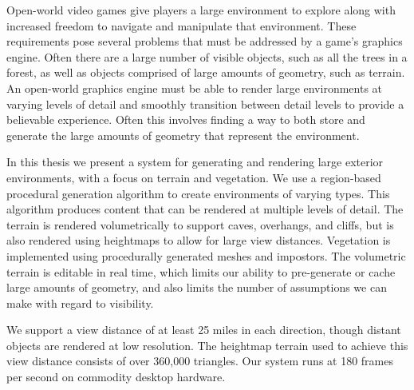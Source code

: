 Open-world video games give players a large environment to explore along with increased freedom to navigate and manipulate that environment.
These requirements pose several problems that must be addressed by a game's graphics engine.
Often there are a large number of visible objects, such as all the trees in a forest, as well as objects comprised of large amounts of geometry, such as terrain.
An open-world graphics engine must be able to render large environments at varying levels of detail and smoothly transition between detail levels to provide a believable experience.
Often this involves finding a way to both store and generate the large amounts of geometry that represent the environment.

In this thesis we present a system for generating and rendering large exterior environments, with a focus on terrain and vegetation.
We use a region-based procedural generation algorithm to create environments of varying types.
This algorithm produces content that can be rendered at multiple levels of detail.
The terrain is rendered volumetrically to support caves, overhangs, and cliffs, but is also rendered using heightmaps to allow for large view distances.
Vegetation is implemented using procedurally generated meshes and impostors.
The volumetric terrain is editable in real time, which limits our ability to pre-generate or cache large amounts of geometry, and also limits the number of assumptions we can make with regard to visibility.

We support a view distance of at least 25 miles in each direction, though distant objects are rendered at low resolution.
The heightmap terrain used to achieve this view distance consists of over 360,000 triangles.
Our system runs at 180 frames per second on commodity desktop hardware.
